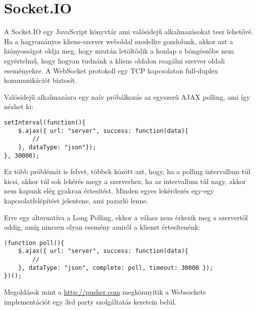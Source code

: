 \section{Socket.IO}
A Socket.IO egy JavaScript könyvtár ami valósidejű alkalmazásokat tesz lehetővé. Ha a hagyományos kliens-szerver weboldal modellre gondolunk, akkor azt a hiányosságot oldja meg, hogy miután letöltődik a honlap a böngészőbe nem egyértelmű, hogy hogyan tudnánk a kliens oldalon reagálni szerver oldali eseményekre. A WebSocket protokoll egy TCP kapcsolaton full-duplex kommunikációt biztosít.

Valósidejű alkalmazásra egy naív próbálkozás az egyszerű AJAX polling, ami így nézhet ki:
\medskip
\begin{lstlisting}[caption=Egyszerű polling]
setInterval(function(){
    $.ajax({ url: "server", success: function(data){
        //
    }, dataType: "json"});
}, 30000);
\end{lstlisting}

Ez több próblémát is felvet, többek között azt, hogy, ha a polling intervallum túl kicsi, akkor túl sok lekérés megy a szerverhez, ha az intervallum túl nagy, akkor nem kapunk elég gyakran értesítést. Minden egyes lekérdezés egy-egy kapcsolatfelépítést jelentene, ami pazarló lenne.

Erre egy alternatíva a Long Polling, ekkor a válasz nem érkezik meg a szervertől addig, amíg nincsen olyan esemény amiről a klienst értesítenénk:

\begin{lstlisting}[caption=Long Polling]
(function poll(){
    $.ajax({ url: "server", success: function(data){
        // 
    }, dataType: "json", complete: poll, timeout: 30000 });
})();
\end{lstlisting}


Megoldások mint a \url{http://pusher.com} megkönnyítik a Websockets implementációt egy 3rd party szolgáltatás keretein belül.